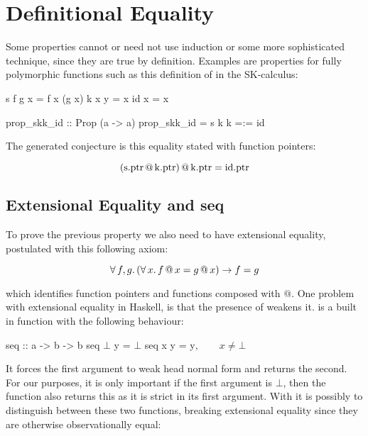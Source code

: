 \section{Definitional Equality}
\label{sec:equality}

Some properties cannot or need not use induction or some more
sophisticated technique, since they are true by definition. Examples
are properties for fully polymorphic functions such as this definition
of  in the SK-calculus:

\begin{code}
s f g x = f x (g x)
k x y = x
id x = x

prop_skk_id :: Prop (a -> a)
prop_skk_id = s k k =:= id
\end{code}

The generated conjecture is this equality stated with function pointers:

\begin{equation*}
(\mathrm{s.ptr} \, @ \, \mathrm{k.ptr} )
     \, @ \, \mathrm{k.ptr} = \mathrm{id.ptr}
\end{equation*}

\subsection{Extensional Equality and seq}

To prove the previous property we also need to have extensional
equality, postulated with this following axiom:

\begin{equation*}
\forall \, f , g . \, (\forall \, x . \, f \, @ \, x = g \, @ \, x) \rightarrow f = g
\end{equation*}

\noindent
which identifies function pointers and functions composed with $@$.
One problem with extensional equality in Haskell, is that the presence
of  weakens it.  is a built in function with the
following behaviour:

\begin{code}[mathescape]
seq :: a -> b -> b
seq $\bot$ y = $\bot$
seq x y = y$, \qquad x \neq \bot$
\end{code}

It forces the first argument to weak head normal form and returns the
second. For our purposes, it is only important if the first argument
is $\bot$, then the function also returns this as it is strict in its
first argument. With  it is possibly to distinguish between
these two functions, breaking extensional equality since they are
otherwise observationally equal:

